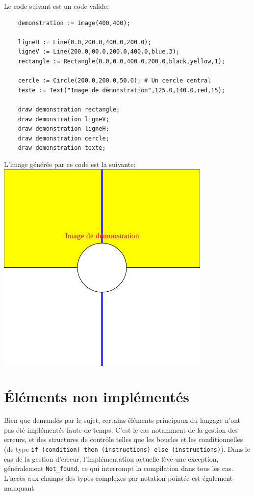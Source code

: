 \documentclass[a4paper, 12pt]{report}
\begin{document}
	Le code suivant est un code valide:
	
	\begin{verbatim}
	demonstration := Image(400,400);

	ligneH := Line(0.0,200.0,400.0,200.0);
	ligneV := Line(200.0,00.0,200.0,400.0,blue,3);
	rectangle := Rectangle(0.0,0.0,400.0,200.0,black,yellow,1);

	cercle := Circle(200.0,200.0,50.0); # Un cercle central
	texte := Text("Image de démonstration",125.0,140.0,red,15);

	draw demonstration rectangle;
	draw demonstration ligneV;
	draw demonstration ligneH;
	draw demonstration cercle;
	draw demonstration texte;
	\end{verbatim}
	
	L'image générée par ce code est la suivante:\\
	
	\includegraphics{demonstration.png}~\\
	
	\section{\'Eléments non implémentés}
	
	Bien que demandés par le sujet, certains éléments principaux du langage n'ont pas été implémentés faute de temps. C'est le cas notamment de la gestion des erreurs, et des structures de contrôle telles que les boucles et les conditionnelles (de type \texttt{if (condition) then (instructions) else (instructions)}). Dans le cas de la gestion d'erreur, l'implémentation actuelle lève une exception, généralement \texttt{Not\_found}, ce qui interrompt la compilation dans tous les cas. L'accès aux champs des types complexes par notation pointée est également manquant.
\end{document}
